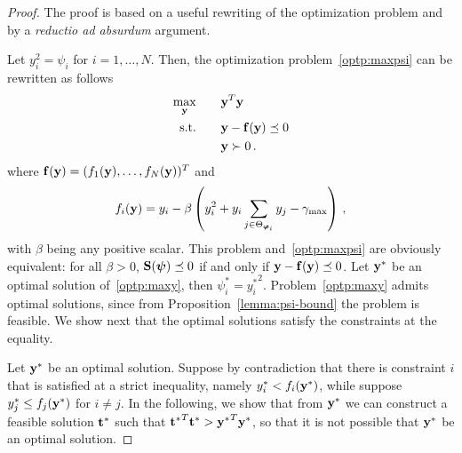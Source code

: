 \documentclass[a4paper,notitlepage,onecolumn]{article}
\def\f{{\bf f}}
\def\t{{\bf t}}
\def\y{{\bf y}}
\def\S{{\bf S}}
\def\psib{\boldsymbol{\psi}}
\def\varphib{\boldsymbol{\varphi}}
\numberwithin{equation}{section}
\begin{document}
\begin{proof}
The proof is based on a useful rewriting of the optimization
problem and by a {\it reductio ad absurdum} argument.

Let $y_i^2=\psi_i$ for $i=1,\ldots,N$. Then, the optimization problem~\eqref{optp:maxpsi} can be rewritten as follows
\begin{align}
    \max_{\y}\qquad & \y^T\y \label{optp:maxy}  \\
    \mathrm{s.t.} \qquad & \y-\f(\y) \preceq 0 \label{eq:constrainty} \\
    &\y \succ 0 \nonumber \,.
\end{align}
where $\f(\y)=(f_1(\y), \ldots, f_N(\y))^T$ and
\begin{align*}
   f_i(\y)=y_i-\beta\left(y_i^2 + y_i\mathop{\sum_{j\in \Theta_{\varphib_i}}}y_j - \gamma_{\max}\right) \,,
\end{align*}
with $\beta$ being any positive scalar. This problem
and~\eqref{optp:maxpsi} are obviously equivalent: for all
$\beta>0$, $\S(\psib) \preceq 0$ if and only if $\y-\f(\y)\preceq
0$. Let $\y^*$ be an optimal solution of~\eqref{optp:maxy}, then
$\psi_i^*={y_i^*}^2$. Problem~\eqref{optp:maxy} admits optimal
solutions, since from Proposition~\ref{lemma:psi-bound} the
problem is feasible. We show next that the optimal solutions
satisfy the constraints at the equality.

Let $\y^*$ be an optimal solution. Suppose by contradiction that
there is constraint $i$ that is satisfied at a strict inequality,
namely $y_i^* < f_i(\y^*)$, while suppose $y_j^*\leq f_j(\y^*)$
for $i\neq j$. In the following, we show that from $\y^*$ we can
construct a feasible solution $\t^*$ such that ${\t^*}^T\t^* >
{\y^*}^T\y^* $, so that it is not possible that $\y^*$ be an
optimal solution.


\end{proof}
\end{document}
